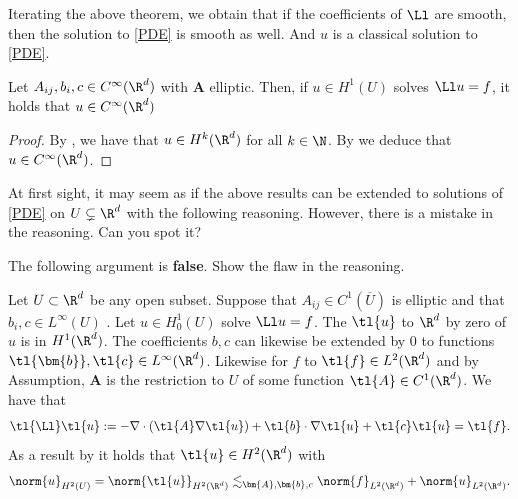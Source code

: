 \documentclass[
    a4paper,
    DIV=14,
    abstract=true,
    numbers=noenddot
]{scrartcl}
\begin{document}
Iterating the above theorem, we obtain that if the coefficients of $\Ll$ are smooth, then the solution to \eqref{PDE} is smooth as well. And $u$ is a classical solution to \eqref{PDE}.
\begin{theorem}\label{infinite interior regularity}
    Let $A_{ij}, b_i,c \in C^{\infty}(\R^d)$ with $\bm{A}$ elliptic. Then, if $u \in H^1(U)$ solves $\Ll u=f$, it holds that $u \in C^\infty(\R^d)$
\end{theorem}
\begin{proof}
    By , we have that $u \in H^k(\R^d)$ for all $k \in \N$. By  we deduce that $u \in C^\infty(\R^d)$.
\end{proof}


At first sight, it may seem as if the above results can be extended to solutions of \eqref{PDE} on $U \subsetneq \R^d$ with the following reasoning. However, there is a mistake in the reasoning. Can you spot it?
\begin{exercise}
    The following argument is \textbf{false}. Show the flaw in the reasoning.

    Let $U \subset \R^d$ be any open subset. Suppose that $A_{ij}\in C^1(\overline{U} )$ is elliptic and that $b_i, c \in L^\infty(U)$ . Let $u \in H_0^1(U)$ solve $\Ll u=f$. The  $\tl{u}$ to $\R^d$ by zero of $u$ is in $H^1(\R^d)$. The coefficients $b,c$ can likewise be extended by $0$ to functions $\tl{\bm{b}}, \tl{c} \in  L^\infty(\R^d)$. Likewise for $f$ to $\tl{f} \in L^2(\R^d) $ and by Assumption, $\bm{A}$ is the restriction to $U$ of some function $\tl{A} \in C^1(\R^d)$. We have that 
    \begin{align}\label{extension}
        \tl{\Ll} \tl{u} := -\nabla \cdot (\tl{A} \nabla \tl{u})+ \tl{b} \cdot \nabla \tl{u} + \tl{c} \tl{u} =\tl{f} .
    \end{align}
    As a result by  it holds that $\tl{u} \in H^2(\R^d)$ with
    \begin{align*}
        \norm{u}_{H^2(U)}=  \norm{\tl{u} }_{H^2(\R^d)} \lesssim_{\bm{A},\bm{b},c} \norm{f}_{L^2(\R^d)}+\norm{u}_{L^2(\R^d)}.
    \end{align*}
\end{exercise}
\end{document}

